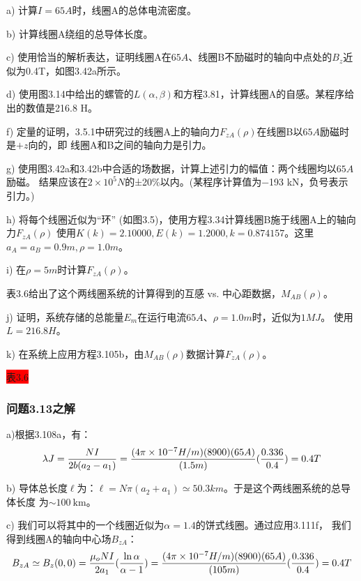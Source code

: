 a) 计算$I=65 A$时，线圈A的总体电流密度。

b) 计算线圈A绕组的总导体长度。

c) 使用恰当的解析表达，证明线圈A在$65A$、线圈B不励磁时的轴向中点处的$B_z$近似为0.4T，如图3.42a所示。

d) 使用图3.14中给出的螺管的$L(\alpha,\beta)$和方程3.81，计算线圈A的自感。某程序给出的数值是216.8 H。

f) 定量的证明，3.5.1中研究过的线圈A上的轴向力$F_{zA}(\rho)$在线圈B以$65A$励磁时是$+z$向的，即
线圈A和B之间的轴向力是引力。

g) 使用图3.42a和3.42b中合适的场数据，计算上述引力的幅值：两个线圈均以$65A$励磁。
结果应该在$2\times 10^5 N$的±20\%以内。(某程序计算值为−193 kN，负号表示引力。)

h) 将每个线圈近似为“环” (如图3.5)，使用方程3.34计算线圈B施于线圈A上的轴向力$F_{zA}(\rho)$
使用$K(k) =2.10000,E(k)=1.2000,k=0.874157$。这里$a_A=a_B=0.9 m,\rho=1.0 m$。

i) 在$\rho=5 m$时计算$F_{zA}(\rho)$。

表3.6给出了这个两线圈系统的计算得到的互感 vs. 中心距数据，$M_{AB}(\rho)$。

j) 证明，系统存储的总能量$E_m$在运行电流$65A$、$\rho=1.0 m$时，近似为$1 MJ$。
使用$L=216.8 H$。

k) 在系统上应用方程3.105b，由$M_{AB}(\rho)$数据计算$F_{zA}(\rho)$。

\colorbox{red}{表3.6}

\subsubsection{问题3.13之解}
a)根据3.108a，有：
\begin{equation}
\lambda J=\frac{NI}{2b(a_{2}-a_{1})}\\%
=\frac{(4\pi\times 10^{-7}H/m)(8900)(65A)}{(1.5m)}(\frac{0.336}{0.4})=0.4T
\end{equation}

b) 导体总长度$\ell$为：$\ell=N\pi(a_2+a_1)\simeq 50.3 km$。于是这个两线圈系统的总导体长度
为$\sim 100\ \mathrm{km}$。

c) 我们可以将其中的一个线圈近似为$\alpha=1.4$的饼式线圈。通过应用3.111f，
我们得到线圈A的轴向中心场$B_{zA}$：
\begin{equation}
B_{zA}\simeq B_{z}(0,0)=\frac{\mu_{o}NI}{2a_{1}}(\frac{\ln\alpha}{\alpha-1})\\%
=\frac{(4\pi\times 10^{-7}H/m)(8900)(65A)}{(105m)}(\frac{0.336}{0.4})=0.4T
\end{equation}


